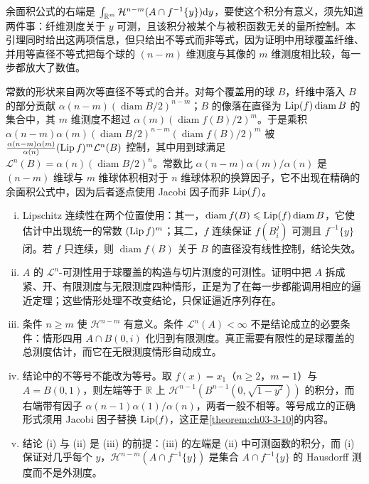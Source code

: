 \documentclass[../../main.tex]{subfiles}%
\begin{document}
\begin{remark}\label{remark:ch03-lem-3-5-动机}
余面积公式的右端是 $\int_{\mathbb{R}^m}\mathcal{H}^{n-m}(A\cap f^{-1}\{y\})\mathrm{d} y$，要使这个积分有意义，须先知道两件事：纤维测度关于 $y$ 可测，且该积分被某个与被积函数无关的量所控制。本引理同时给出这两项信息，但只给出不等式而非等式，因为证明中用球覆盖纤维、并用等直径不等式把每个球的 $(n-m)$ 维测度与其像的 $m$ 维测度相比较，每一步都放大了数值。

常数的形状来自两次等直径不等式的合并。对每个覆盖用的球 $B$，纤维中落入 $B$ 的部分贡献 $\alpha(n-m)(\operatorname{diam}B/2)^{n-m}$；$B$ 的像落在直径为 $\operatorname{Lip}(f)\operatorname{diam}B$ 的集合中，其 $m$ 维测度不超过 $\alpha(m)(\operatorname{diam}f(B)/2)^m$。于是乘积 $\alpha(n-m)\alpha(m)(\operatorname{diam}B/2)^{n-m}(\operatorname{diam}f(B)/2)^m$ 被 $\frac{\alpha(n-m)\alpha(m)}{\alpha(n)}(\operatorname{Lip} f)^m\mathcal{L}^n(B)$ 控制，其中用到球满足 $\mathcal{L}^n(B)=\alpha(n)(\operatorname{diam}B/2)^n$。常数比 $\alpha(n-m)\alpha(m)/\alpha(n)$ 是 $(n-m)$ 维球与 $m$ 维球体积相对于 $n$ 维球体积的换算因子，它不出现在精确的余面积公式中，因为后者逐点使用 Jacobi 因子而非 $\operatorname{Lip}(f)$。
\end{remark}

\begin{remark}\label{remark:ch03-lem-3-5-条件}
\begin{enumerate}[(i)]
\item Lipschitz 连续性在两个位置使用：其一，$\operatorname{diam}f(B)\leqslant\operatorname{Lip}(f)\operatorname{diam}B$，它使估计中出现统一的常数 $(\operatorname{Lip} f)^m$；其二，$f$ 连续保证 $f(B_i^j)$ 可测且 $f^{-1}\{y\}$ 闭。若 $f$ 只连续，则 $\operatorname{diam}f(B)$ 关于 $B$ 的直径没有线性控制，结论失效。
\item $A$ 的 $\mathcal{L}^n$-可测性用于球覆盖的构造与切片测度的可测性。证明中把 $A$ 拆成紧、开、有限测度与无限测度四种情形，正是为了在每一步都能调用相应的逼近定理；这些情形处理不改变结论，只保证逼近序列存在。
\item 条件 $n\geqslant m$ 使 $\mathcal{H}^{n-m}$ 有意义。条件 $\mathcal{L}^n(A)<\infty$ 不是结论成立的必要条件：情形四用 $A\cap B(0,i)$ 化归到有限测度。真正需要有限性的是球覆盖的总测度估计，而它在无限测度情形自动成立。
\item 结论中的不等号不能改为等号。取 $f(x)=x_1$（$n\geqslant2$，$m=1$）与 $A=B(0,1)$，则左端等于 $\mathbb{R}$ 上 $\mathcal{H}^{n-1}(B^{n-1}(0,\sqrt{1-y^2}))$ 的积分，而右端带有因子 $\alpha(n-1)\alpha(1)/\alpha(n)$，两者一般不相等。等号成立的正确形式须用 Jacobi 因子替换 $\operatorname{Lip}(f)$，这正是\cref{theorem:ch03-3-10}的内容。%
\item 结论 (i) 与 (ii) 是 (iii) 的前提：(iii) 的左端是 (ii) 中可测函数的积分，而 (i) 保证对几乎每个 $y$，$\mathcal{H}^{n-m}(A\cap f^{-1}\{y\})$ 是集合 $A\cap f^{-1}\{y\}$ 的 Hausdorff 测度而不是外测度。
\end{enumerate}
\end{remark}
\end{document}
